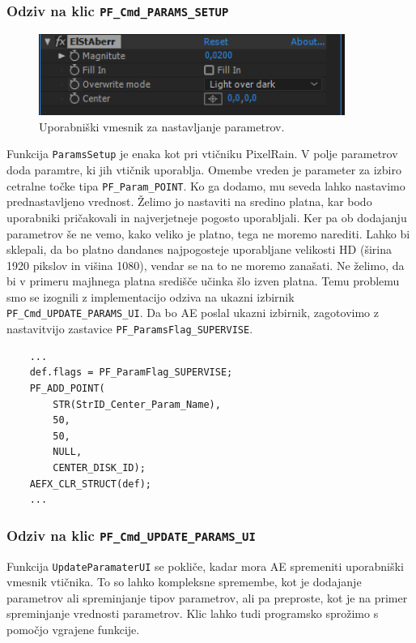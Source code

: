 \documentclass[a4paper, 12pt]{book}
\begin{document}
\subsubsection{Odziv na klic \texttt{PF\_Cmd\_PARAMS\_SETUP}}

\begin{figure}[t]
\begin{center}
\includegraphics[width=10cm]{img/elstaberrUI.png}
\end{center}
\caption{Uporabniški vmesnik za nastavljanje parametrov.}
\label{ui2}
\end{figure}

Funkcija \verb!ParamsSetup! je enaka kot pri vtičniku PixelRain.
V polje parametrov doda paramtre, ki jih vtičnik uporablja.
Omembe vreden je parameter za izbiro cetralne točke tipa \verb!PF_Param_POINT!.
Ko ga dodamo, mu seveda lahko nastavimo prednastavljeno vrednost.
Želimo jo nastaviti na sredino platna, kar bodo uporabniki pričakovali in najverjetneje pogosto uporabljali.
Ker pa ob dodajanju parametrov še ne vemo, kako veliko je platno, tega ne moremo narediti.
Lahko bi sklepali, da bo platno dandanes najpogosteje uporabljane velikosti HD (širina 1920 pikslov in višina 1080), vendar se na to ne moremo zanašati.
Ne želimo, da bi v primeru majhnega platna središče učinka šlo izven platna.
Temu problemu smo se izognili z implementacijo odziva na ukazni izbirnik \verb!PF_Cmd_UPDATE_PARAMS_UI!.
Da bo AE poslal ukazni izbirnik, zagotovimo z nastavitvijo zastavice \verb!PF_ParamsFlag_SUPERVISE!.

\begin{verbatim}
    ...
    def.flags = PF_ParamFlag_SUPERVISE;
    PF_ADD_POINT(
        STR(StrID_Center_Param_Name),
        50,
        50,
        NULL,
        CENTER_DISK_ID);
    AEFX_CLR_STRUCT(def);
    ...
\end{verbatim}

\subsubsection{Odziv na klic \texttt{PF\_Cmd\_UPDATE\_PARAMS\_UI}}

Funkcija \verb!UpdateParamaterUI! se pokliče, kadar mora AE spremeniti uporabniški vmesnik vtičnika.
To so lahko kompleksne spremembe, kot je dodajanje parametrov ali spreminjanje tipov parametrov, ali pa preproste,
kot je na primer spreminjanje vrednosti parametrov.
Klic lahko tudi programsko sprožimo s pomočjo vgrajene funkcije.
\end{document}
